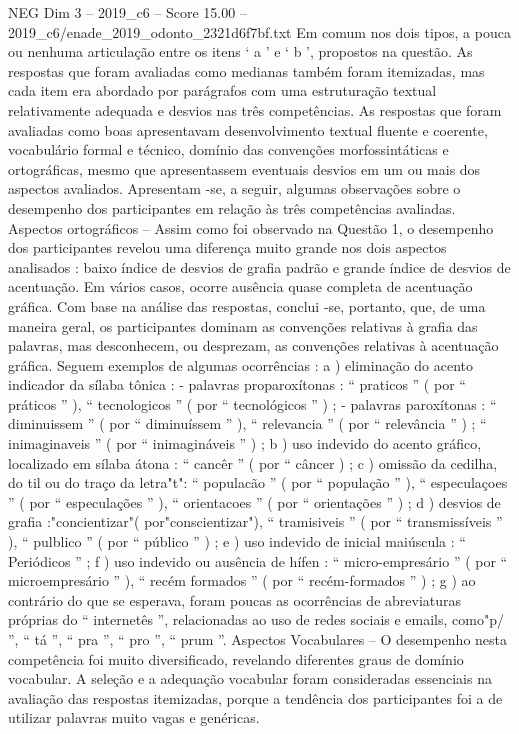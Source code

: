 \begin{textsample}{NEG Dim 3 – 2019\_c6 – Score 15.00 – 2019\_c6/enade\_2019\_odonto\_2321d6f7bf.txt}
Em comum nos dois tipos, a pouca ou nenhuma articulação entre os itens ‘ a ’ e ‘ b ’, propostos na questão.
As respostas que foram avaliadas como medianas também foram itemizadas, mas cada item era abordado por parágrafos com uma estruturação textual relativamente adequada e desvios nas três competências.
As respostas que foram avaliadas como boas apresentavam desenvolvimento textual fluente e coerente, vocabulário formal e técnico, domínio das convenções morfossintáticas e ortográficas, mesmo que apresentassem eventuais desvios em um ou mais dos aspectos avaliados.
Apresentam -se, a seguir, algumas observações sobre o desempenho dos participantes em relação às três competências avaliadas.
Aspectos ortográficos – Assim como foi observado na Questão 1, o desempenho dos participantes revelou uma diferença muito grande nos dois aspectos analisados : baixo índice de desvios de grafia padrão e grande índice de desvios de acentuação.
Em vários casos, ocorre ausência quase completa de acentuação gráfica.
Com base na análise das respostas, conclui -se, portanto, que, de uma maneira geral, os participantes dominam as convenções relativas à grafia das palavras, mas desconhecem, ou desprezam, as convenções relativas à acentuação gráfica.
Seguem exemplos de algumas ocorrências : a ) eliminação do acento indicador da sílaba tônica : - palavras proparoxítonas : “ praticos ” ( por “ práticos ” ), “ tecnologicos ” ( por “ tecnológicos ” ) ; - palavras paroxítonas : “ diminuissem ” ( por “ diminuíssem ” ), “ relevancia ” ( por “ relevância ” ) ; “ inimaginaveis ” ( por “ inimagináveis ” ) ; b ) uso indevido do acento gráfico, localizado em sílaba átona : “ cancêr ” ( por “ câncer ) ; c ) omissão da cedilha, do til ou do traço da letra"t": “ populacão ” ( por “ população ” ), “ especulaçoes ” ( por “ especulações ” ), “ orientacoes ” ( por “ orientações ” ) ; d ) desvios de grafia :"concientizar"( por"conscientizar"), “ tramisiveis ” ( por “ transmissíveis ” ), “ pulblico ” ( por “ público ” ) ; e ) uso indevido de inicial maiúscula : “ Periódicos ” ; f ) uso indevido ou ausência de hífen : “ micro-empresário ” ( por “ microempresário ” ), “ recém formados ” ( por “ recém-formados ” ) ; g ) ao contrário do que se esperava, foram poucas as ocorrências de abreviaturas próprias do “ internetês ”, relacionadas ao uso de redes sociais e emails, como"p/ ”, “ tá ”, “ pra ”, “ pro ”, “ prum ”.
Aspectos Vocabulares – O desempenho nesta competência foi muito diversificado, revelando diferentes graus de domínio vocabular.
A seleção e a adequação vocabular foram consideradas essenciais na avaliação das respostas itemizadas, porque a tendência dos participantes foi a de utilizar palavras muito vagas e genéricas.

\end{textsample}
